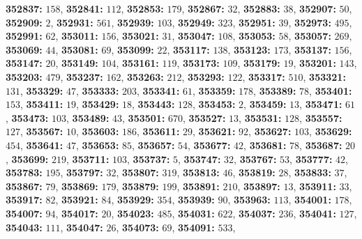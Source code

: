 \textsf{\bfseries 352837:} $158$, \textsf{\bfseries 352841:} $112$, \textsf{\bfseries 352853:} $179$, \textsf{\bfseries 352867:} $32$, \textsf{\bfseries 352883:} $38$, \textsf{\bfseries 352907:} $50$, \textsf{\bfseries 352909:} $2$, \textsf{\bfseries 352931:} $561$, \textsf{\bfseries 352939:} $103$, \textsf{\bfseries 352949:} $323$, \textsf{\bfseries 352951:} $39$, \textsf{\bfseries 352973:} $495$, \textsf{\bfseries 352991:} $62$, \textsf{\bfseries 353011:} $156$, \textsf{\bfseries 353021:} $31$, \textsf{\bfseries 353047:} $108$, \textsf{\bfseries 353053:} $58$, \textsf{\bfseries 353057:} $269$, \textsf{\bfseries 353069:} $44$, \textsf{\bfseries 353081:} $69$, \textsf{\bfseries 353099:} $22$, \textsf{\bfseries 353117:} $138$, \textsf{\bfseries 353123:} $173$, \textsf{\bfseries 353137:} $156$, \textsf{\bfseries 353147:} $20$, \textsf{\bfseries 353149:} $104$, \textsf{\bfseries 353161:} $119$, \textsf{\bfseries 353173:} $109$, \textsf{\bfseries 353179:} $19$, \textsf{\bfseries 353201:} $143$, \textsf{\bfseries 353203:} $479$, \textsf{\bfseries 353237:} $162$, \textsf{\bfseries 353263:} $212$, \textsf{\bfseries 353293:} $122$, \textsf{\bfseries 353317:} $510$, \textsf{\bfseries 353321:} $131$, \textsf{\bfseries 353329:} $47$, \textsf{\bfseries 353333:} $203$, \textsf{\bfseries 353341:} $61$, \textsf{\bfseries 353359:} $178$, \textsf{\bfseries 353389:} $78$, \textsf{\bfseries 353401:} $153$, \textsf{\bfseries 353411:} $19$, \textsf{\bfseries 353429:} $18$, \textsf{\bfseries 353443:} $128$, \textsf{\bfseries 353453:} $2$, \textsf{\bfseries 353459:} $13$, \textsf{\bfseries 353471:} $61$, \textsf{\bfseries 353473:} $103$, \textsf{\bfseries 353489:} $43$, \textsf{\bfseries 353501:} $670$, \textsf{\bfseries 353527:} $13$, \textsf{\bfseries 353531:} $128$, \textsf{\bfseries 353557:} $127$, \textsf{\bfseries 353567:} $10$, \textsf{\bfseries 353603:} $186$, \textsf{\bfseries 353611:} $29$, \textsf{\bfseries 353621:} $92$, \textsf{\bfseries 353627:} $103$, \textsf{\bfseries 353629:} $454$, \textsf{\bfseries 353641:} $47$, \textsf{\bfseries 353653:} $85$, \textsf{\bfseries 353657:} $54$, \textsf{\bfseries 353677:} $42$, \textsf{\bfseries 353681:} $78$, \textsf{\bfseries 353687:} $20$, \textsf{\bfseries 353699:} $219$, \textsf{\bfseries 353711:} $103$, \textsf{\bfseries 353737:} $5$, \textsf{\bfseries 353747:} $32$, \textsf{\bfseries 353767:} $53$, \textsf{\bfseries 353777:} $42$, \textsf{\bfseries 353783:} $195$, \textsf{\bfseries 353797:} $32$, \textsf{\bfseries 353807:} $319$, \textsf{\bfseries 353813:} $46$, \textsf{\bfseries 353819:} $28$, \textsf{\bfseries 353833:} $37$, \textsf{\bfseries 353867:} $79$, \textsf{\bfseries 353869:} $179$, \textsf{\bfseries 353879:} $199$, \textsf{\bfseries 353891:} $210$, \textsf{\bfseries 353897:} $13$, \textsf{\bfseries 353911:} $33$, \textsf{\bfseries 353917:} $82$, \textsf{\bfseries 353921:} $84$, \textsf{\bfseries 353929:} $354$, \textsf{\bfseries 353939:} $90$, \textsf{\bfseries 353963:} $113$, \textsf{\bfseries 354001:} $178$, \textsf{\bfseries 354007:} $94$, \textsf{\bfseries 354017:} $20$, \textsf{\bfseries 354023:} $485$, \textsf{\bfseries 354031:} $622$, \textsf{\bfseries 354037:} $236$, \textsf{\bfseries 354041:} $127$, \textsf{\bfseries 354043:} $111$, \textsf{\bfseries 354047:} $26$, \textsf{\bfseries 354073:} $69$, \textsf{\bfseries 354091:} $533$, 

